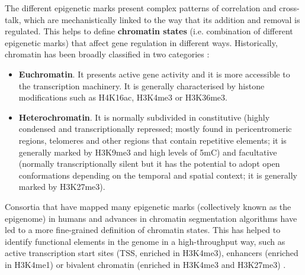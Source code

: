 The different epigenetic marks present complex patterns of correlation and cross-talk, which are mechanistically linked to the way that its addition and removal is regulated. This helps to define \textbf{chromatin states} (i.e. combination of different epigenetic marks) that affect gene regulation in different ways. Historically, chromatin has been broadly classified in two categories \citep{Allis2016,Reinberg2018,Trojer2007}:

\begin{itemize}
	
	\item \textbf{Euchromatin}. It presents active gene activity and it is more accessible to the transcription machinery. It is generally characterised by histone modifications such as H4K16ac, H3K4me3 or H3K36me3.
	
	\item \textbf{Heterochromatin}. It is normally subdivided in constitutive (highly condensed and transcriptionally repressed; mostly found in pericentromeric regions, telomeres and other regions that contain repetitive elements; it is generally marked by H3K9me3 and high levels of \acrshort{5mC}) and facultative (normally transcriptionally silent but it has the potential to adopt open conformations depending on the temporal and spatial context; it is generally marked by H3K27me3).
	
\end{itemize}

Consortia that have mapped many epigenetic marks (collectively known as the epigenome) in humans \citep{Consortium2012, Consortium2015} and advances in chromatin segmentation algorithms \citep{Ernst2010} have led to a more fine-grained definition of chromatin states. This has helped to identify functional elements in the genome in a high-throughput way, such as active transcription start sites (\acrshort{TSS}, enriched in H3K4me3), enhancers (enriched in H3K4me1) or bivalent chromatin (enriched in H3K4me3 and H3K27me3) \citep{Consortium2012, Consortium2015}. 

\bigskip


